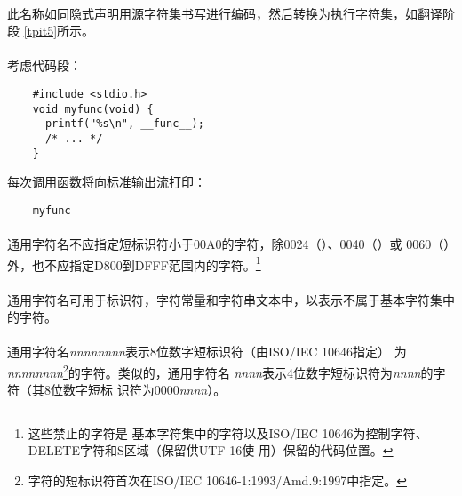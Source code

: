 {\paragraph{}
此名称如同隐式声明用源字符集书写进行编码，然后转换为执行字符集，如翻译阶段
\ref{tpit5}所示。

\paragraph{}
\ex* 考虑代码段：
\begin{lstlisting}
    #include <stdio.h>
    void myfunc(void) {
      printf("%s\n", __func__);
      /* ... */
    }
\end{lstlisting}
每次调用函数将向标准输出流打印：
\begin{lstlisting}
    myfunc
\end{lstlisting}


\syntax
\paragraph{}

\constraint
\paragraph{}
通用字符名不应指定短标识符小于00A0的字符，除0024（\tm{\$}）、0040（）或
0060（\tm{\sq}）外，也不应指定D800到DFFF范围内的字符。\footnote{这些禁止的字符是
基本字符集中的字符以及ISO/IEC 10646为控制字符、DELETE字符和S区域（保留供UTF-16使
用）保留的代码位置。}

\desc
\paragraph{}
通用字符名可用于标识符，字符常量和字符串文本中，以表示不属于基本字符集中的字符。

\semantic
\paragraph{}
通用字符名\textit{nnnnnnnn}表示8位数字短标识符（由ISO/IEC 10646指定）
为\linebreak\textit{nnnnnnnn}\footnote{字符的短标识符首次在ISO/IEC
10646-1:1993/Amd.9:1997中指定。}的字符。类似的，通用字符名
\textit{nnnn}表示4位数字短标识符为\textit{nnnn}的字符（其8位数字短标
识符为0000\textit{nnnn}）。

}
